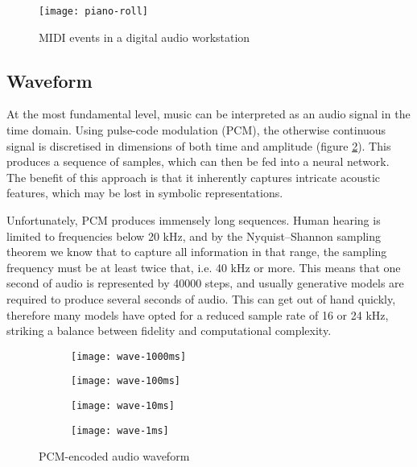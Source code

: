 \documentclass[../../report.tex]{subfiles}
\begin{document}
\begin{figure}
  \centering
  \texttt{[image: piano-roll]}
  \caption{MIDI events in a digital audio workstation}
  \label{fig:piano-roll}
\end{figure}

\subsection{Waveform}

At the most fundamental level, music can be interpreted as an audio signal in
the time domain. Using pulse-code modulation (PCM), the otherwise continuous
signal is discretised in dimensions of both time and amplitude (figure
\ref{fig:pcm}). This produces a sequence of samples, which can then be fed into
a neural network. The benefit of this approach is that it inherently captures
intricate acoustic features, which may be lost in symbolic representations.
\cite{Dieleman2020}

Unfortunately, PCM produces immensely long sequences. Human hearing is limited
to frequencies below 20 kHz, and by the Nyquist--Shannon sampling theorem we
know that to capture all information in that range, the sampling frequency must
be at least twice that, i.e. 40 kHz or more. This means that one second of audio
is represented by \num{40000} steps, and usually generative models are required
to produce several seconds of audio. This can get out of hand quickly, therefore
many models have opted for a reduced sample rate of 16 or 24 kHz, striking a
balance between fidelity and computational complexity. \cite{Dieleman2020}

\begin{figure}
  \centering
  \begin{subfigure}[b]{0.24\textwidth}
    \texttt{[image: wave-1000ms]}
  \end{subfigure}
  \hfill
  \begin{subfigure}[b]{0.24\textwidth}
    \texttt{[image: wave-100ms]}
  \end{subfigure}
  \hfill
  \begin{subfigure}[b]{0.24\textwidth}
    \texttt{[image: wave-10ms]}
  \end{subfigure}
  \hfill
  \begin{subfigure}[b]{0.24\textwidth}
    \texttt{[image: wave-1ms]}
  \end{subfigure}
  \caption{PCM-encoded audio waveform \cite{Oord2016}}
  \label{fig:pcm}
\end{figure}
\end{document}
